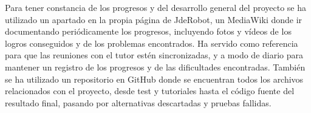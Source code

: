 Para tener constancia de los progresos y del desarrollo general del proyecto se ha utilizado un apartado en la propia página de JdeRobot, un MediaWiki\cite{mediawiki} donde ir documentando periódicamente los progresos, incluyendo fotos y vídeos de los logros conseguidos y de los problemas encontrados. Ha servido como referencia para que las reuniones con el tutor estén sincronizadas, y a modo de diario para mantener un registro de los progresos y de las dificultades encontradas. También se ha utilizado un repositorio en GitHub\cite{mirepo} donde se encuentran todos los archivos relacionados con el proyecto, desde test y tutoriales hasta el código fuente del resultado final, pasando por alternativas descartadas y pruebas fallidas.











